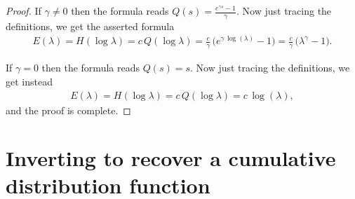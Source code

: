 \begin{proof}
  If $\gamma \ne 0$ then the formula reads
  $Q(s) = \frac{e^{\gamma s} - 1}{\gamma}$.
  Now just tracing the definitions, we get the asserted formula
  \begin{align*}
  E(\lambda) = H(\log \lambda)
    = c \, Q(\log \lambda) = \frac{c}{\gamma} \, \big( e^{\gamma \, \log(\lambda)} - 1 \big)
    = \frac{c}{\gamma} \, \big( \lambda^{\gamma} - 1 \big) .
  \end{align*}

  If $\gamma = 0$ then the formula reads $Q(s) = s$.
  Now just tracing the definitions, we get instead
  \begin{align*}
  E(\lambda) = H(\log \lambda)
    = c \, Q(\log \lambda) = c \, \log(\lambda) ,
  \end{align*}
  and the proof is complete.
\end{proof}


\section{Inverting to recover a cumulative distribution function}


